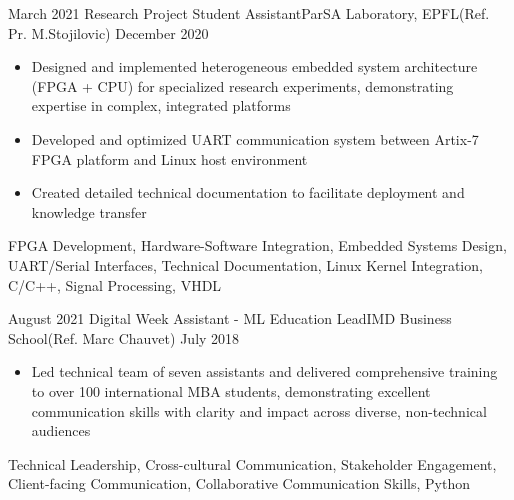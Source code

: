 \begin{experiences}
{{                     %
                     }
  \emptySeparator
  \experience
    {March 2021}   {Research Project Student Assistant}{ParSA Laboratory, EPFL}{(Ref. Pr. M.Stojilovic)}
    {December 2020} {
                      \begin{itemize}
                        \item Designed and implemented heterogeneous embedded system architecture (FPGA + CPU) for specialized research experiments, demonstrating expertise in complex, integrated platforms
                        \item Developed and optimized UART communication system between Artix-7 FPGA platform and Linux host environment
                        \item Created detailed technical documentation to facilitate deployment and knowledge transfer
                      \end{itemize}
                    }
                    {FPGA Development, Hardware-Software Integration, Embedded Systems Design, UART/Serial Interfaces, Technical Documentation, Linux Kernel Integration, C/C++, Signal Processing, VHDL}
  \emptySeparator
  }
\experience
    {August 2021}   {Digital Week Assistant - ML Education Lead}{IMD Business School}{(Ref. Marc Chauvet)}
    {July 2018} {
                      \begin{itemize}
                        \item Led technical team of seven assistants and delivered comprehensive training to over 100 international MBA students, demonstrating excellent communication skills with clarity and impact across diverse, non-technical audiences
                      \end{itemize}
                    }
                    {Technical Leadership, Cross-cultural Communication, Stakeholder Engagement, Client-facing Communication, Collaborative Communication Skills, Python}
  \emptySeparator
\end{experiences}